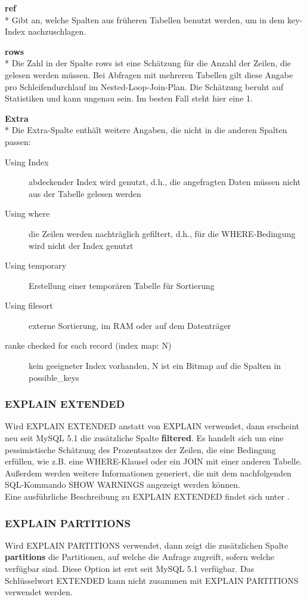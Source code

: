 \textbf{ref}\\*
Gibt an, welche Spalten aus früheren Tabellen benutzt werden, um in dem key-Index nachzuschlagen.

\textbf{rows}\\*
Die Zahl in der Spalte rows ist eine Schätzung für die Anzahl der Zeilen, die gelesen werden müssen.
Bei Abfragen mit mehreren Tabellen gilt diese Angabe pro Schleifendurchlauf im Nested-Loop-Join-Plan.
Die Schätzung beruht auf Statistiken und kann ungenau sein. Im besten Fall steht hier eine 1.

\textbf{Extra}\\*
Die Extra-Spalte enthält weitere Angaben, die nicht in die anderen Spalten passen:
\begin{description}
\item[Using Index] abdeckender Index wird genutzt, d.h., die angefragten Daten müssen nicht aus der Tabelle gelesen werden
\item[Using where] die Zeilen werden nachträglich gefiltert, d.h., für die WHERE-Bedingung wird nicht der Index genutzt
\item[Using temporary] Erstellung einer temporären Tabelle für Sortierung 
\item[Using filesort] externe Sortierung, im RAM oder auf dem Datenträger
\item[ranke checked for each record (index map: N)] kein geeigneter Index vorhanden, N ist ein Bitmap auf die Spalten in possible\_keys
\end{description}

\subsubsection{EXPLAIN EXTENDED}
Wird EXPLAIN EXTENDED anstatt von EXPLAIN verwendet, dann erscheint neu seit MySQL 5.1 die zusätzliche Spalte \textbf{filtered}. Es handelt sich um eine pessimistische Schätzung des Prozentsatzes der Zeilen, die eine Bedingung erfüllen, wie z.B. eine WHERE-Klausel oder ein JOIN mit einer anderen Tabelle.
Außerdem werden weitere Informationen generiert, die mit dem nachfolgenden SQL-Kommando SHOW WARNINGS angezeigt werden können.\\
Eine ausführliche Beschreibung zu EXPLAIN EXTENDED findet sich unter \cite{refman3}.

\subsubsection{EXPLAIN PARTITIONS}
Wird EXPLAIN PARTITIONS verwendet, dann zeigt die zusätzlichen Spalte \textbf{partitions} die Partitionen, auf welche die Anfrage zugreift, sofern welche verfügbar sind. Diese Option ist erst seit MySQL 5.1 verfügbar.
Das Schlüsselwort EXTENDED kann nicht zusammen mit EXPLAIN PARTITIONS verwendet werden.

